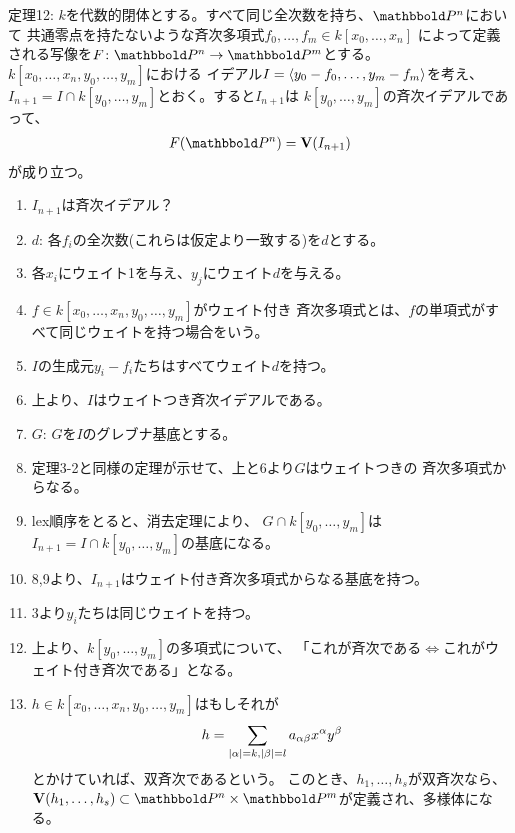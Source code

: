 \begin{framed}
  定理12:
  $k$を代数的閉体とする。すべて同じ全次数を持ち、$\P^n$において
  共通零点を持たないような斉次多項式$f_0,\dots,f_m \in k[x_0,\dots,x_n]$
  によって定義される写像を$F\colon \P^n \to \P^m$とする。
  $k[x_0,\dots,x_n,y_0,\dots,y_m]$における
  イデアル$I=\left\langle y_0-f_0,\dots,y_m-f_m \right\rangle$を考え、
  $I_{n+1} = I\cap k[y_0,\dots,y_m]$とおく。すると$I_{n+1}$は
  $k[y_0,\dots,y_m]$の斉次イデアルであって、
  \begin{align}
    F(\P^n)  = \var(I_{n+1})
  \end{align}
  が成り立つ。
\end{framed}
\begin{myproof}
  \begin{enumerate}
    \item $I_{n+1}$は斉次イデアル？
    \item $d$: 各$f_i$の全次数(これらは仮定より一致する)を$d$とする。
    \item 各$x_i$にウェイト1を与え、$y_j$にウェイト$d$を与える。
    \item $f \in k[x_0,\dots,x_n,y_0,\dots,y_m]$がウェイト付き
    斉次多項式とは、$f$の単項式がすべて同じウェイトを持つ場合をいう。
    \item
    $I$の生成元$y_i-f_i$たちはすべてウェイト$d$を持つ。
    \item
    上より、$I$はウェイトつき斉次イデアルである。
    \item $G$:
    $G$を$I$のグレブナ基底とする。
    \item 定理3-2と同様の定理が示せて、上と6より$G$はウェイトつきの
    斉次多項式からなる。
    \item
    lex順序をとると、消去定理により、
    $G\cap k[y_0,\dots,y_m]$は$I_{n+1} = I\cap k[y_0,\dots,y_m]$の基底になる。
    \item
    8,9より、$I_{n+1}$はウェイト付き斉次多項式からなる基底を持つ。
    \item
    3より$y_i$たちは同じウェイトを持つ。
    \item
    上より、$k[y_0,\dots,y_m]$の多項式について、
    「これが斉次である$\iff$これがウェイト付き斉次である」となる。
    \item
    $h\in k[x_0,\dots,x_n,y_0,\dots,y_m]$はもしそれが
    \begin{align}
      h=\sum_{\left|\alpha\right|=k,\left|\beta\right|=l} a_{\alpha \beta} x^\alpha y^\beta
    \end{align}
    とかけていれば、双斉次であるという。
    このとき、$h_1,\dots,h_s$が双斉次なら、$\var(h_1,\dots,h_s) \subset \P^n \times \P^m$が定義され、多様体になる。

\end{enumerate}
\end{myproof}
